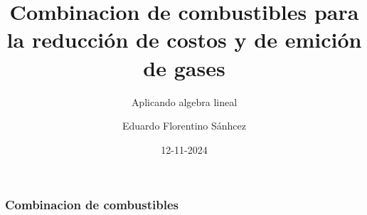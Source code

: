 \documentclass[11pt]{beamer}
\begin{document}
	\author{Eduardo Florentino Sánhcez}
	\title{Combinacion de combustibles para la reducción de costos y de emición de gases}
	\subtitle{Aplicando algebra lineal}
	\date{12-11-2024}
	\begin{frame}[plain]
		\maketitle
	\end{frame}
	
	\begin{frame}
		\frametitle{Combinacion de combustibles}
	\end{frame}
\end{document}
